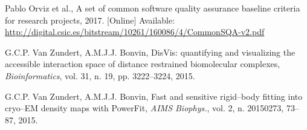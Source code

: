 \documentclass[journal]{IEEEtran}
\begin{document}
\begin{thebibliography}{1}
Pablo Orviz et al.,
A set of common software quality assurance baseline criteria for research projects,
2017.
[Online] Available: \url{http://digital.csic.es/bitstream/10261/160086/4/CommonSQA-v2.pdf}

G.C.P. Van Zundert, A.M.J.J. Bonvin,
DisVis: quantifying and visualizing the accessible interaction space of distance
restrained biomolecular complexes,
\emph{Bioinformatics}, vol. 31, n. 19, pp. 3222--3224, 2015.

G.C.P. Van Zundert, A.M.J.J. Bonvin,
Fast and sensitive rigid--body fitting into cryo--EM density maps with PowerFit,
\emph{AIMS Biophys.}, vol. 2, n. 20150273, 73--87, 2015.

\end{thebibliography}
\end{document}
